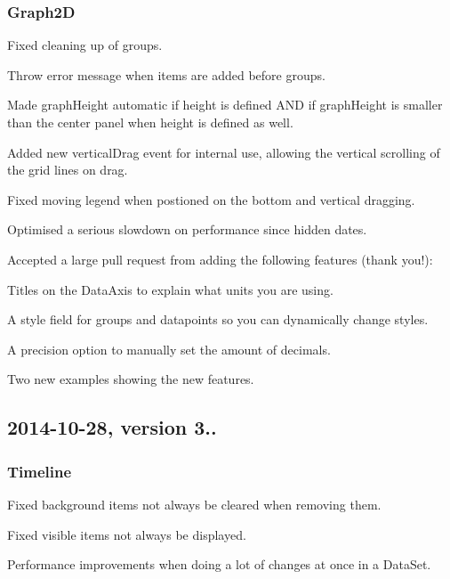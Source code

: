 \subsubsection*{Graph2D}


\begin{DoxyItemize}
\item Fixed cleaning up of groups.
\item Throw error message when items are added before groups.
\item Made graph\+Height automatic if height is defined A\+ND if graph\+Height is smaller than the center panel when height is defined as well.
\item Added new vertical\+Drag event for internal use, allowing the vertical scrolling of the grid lines on drag.
\item Fixed moving legend when postioned on the bottom and vertical dragging.
\item Optimised a serious slowdown on performance since hidden dates.
\item Accepted a large pull request from  adding the following features (thank you!)\+:
\item Titles on the Data\+Axis to explain what units you are using.
\item A style field for groups and datapoints so you can dynamically change styles.
\item A precision option to manually set the amount of decimals.
\item Two new examples showing the new features.
\end{DoxyItemize}

\subsection*{2014-\/10-\/28, version 3..}

\subsubsection*{Timeline}


\begin{DoxyItemize}
\item Fixed background items not always be cleared when removing them.
\item Fixed visible items not always be displayed.
\item Performance improvements when doing a lot of changes at once in a Data\+Set.
\end{DoxyItemize}


